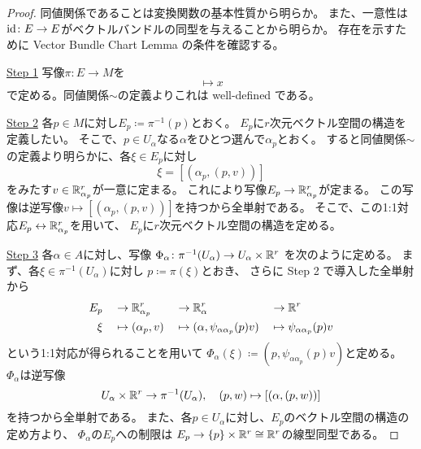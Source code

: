 \documentclass[report]{jlreq}
\begin{document}
\begin{proof}
    同値関係であることは変換関数の基本性質から明らか。
    また、一意性は$\mathrm{id} \colon E \to E$がベクトルバンドルの同型を与えることから明らか。
    存在を示すために
    Vector Bundle Chart Lemma の条件を確認する。

    \underline{Step 1} \quad
    写像$\pi \colon E \to M$を
    \begin{equation}
        [(\alpha, (x, \xi))] \mapsto x
    \end{equation}
    で定める。同値関係$\sim$の定義よりこれは well-defined である。

    \underline{Step 2} \quad
    各$p \in M$に対し$E_p \coloneqq \pi^{-1}(p)$とおく。
    $E_p$に$r$次元ベクトル空間の構造を定義したい。
    そこで、$p \in U_\alpha$なる$\alpha$をひとつ選んで$\alpha_p$とおく。
    すると同値関係$\sim$の定義より明らかに、各$\xi \in E_p$に対し
    \begin{equation}
        \xi = [(\alpha_p, (p, v))]
    \end{equation}
    をみたす$v \in \mathbb{R}^r_{\alpha_p}$が一意に定まる。
    これにより写像$E_p \to \mathbb{R}^r_{\alpha_p}$が定まる。
    この写像は逆写像$v \mapsto [(\alpha_p, (p, v))]$を持つから全単射である。
    そこで、この1:1対応$E_p \leftrightarrow \mathbb{R}^r_{\alpha_p}$を用いて、
    $E_p$に$r$次元ベクトル空間の構造を定める。

    \underline{Step 3} \quad
    各$\alpha \in A$に対し、写像
    $\Phi_\alpha \colon \pi^{-1}(U_\alpha) \to U_\alpha \times \mathbb{R}^r$
    を次のように定める。
    まず、各$\xi \in \pi^{-1}(U_\alpha)$に対し
    $p \coloneqq \pi(\xi)$とおき、
    さらに Step 2 で導入した全単射から
    \begin{alignat}{8}
        E_p \;
            && \to & \; \mathbb{R}^r_{\alpha_p} \;
            & \to & \; \mathbb{R}^r_\alpha \;
            & \to & \; \mathbb{R}^r \\
        \xi \;
            && \mapsto & \; (\alpha_p, v) \;
            & \mapsto & \; (\alpha, \psi_{\alpha\alpha_p}(p) v) \;
            & \mapsto & \; \psi_{\alpha\alpha_p}(p) v
    \end{alignat}
    という1:1対応が得られることを用いて
    $\Phi_\alpha(\xi) \coloneqq (p, \psi_{\alpha\alpha_p}(p) v)$と定める。
    $\Phi_\alpha$は逆写像
    \begin{equation}
        U_\alpha \times \mathbb{R}^r \to \pi^{-1}(U_\alpha),
        \quad
        (p, w) \mapsto [(\alpha, (p, w))]
    \end{equation}
    を持つから全単射である。
    また、各$p \in U_\alpha$に対し、$E_p$のベクトル空間の構造の定め方より、
    $\Phi_\alpha$の$E_p$への制限は
    $E_p \to \{p\} \times \mathbb{R}^r \cong \mathbb{R}^r$の線型同型である。


\end{proof}
\end{document}
